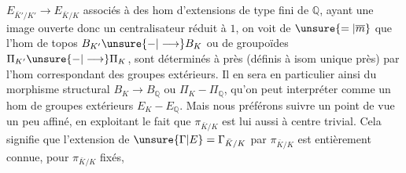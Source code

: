 $E_{\bar K'/K'}\longrightarrow E_{\bar K/K}$ associés à des hom  d'extensions de type fini de $\mathbb Q$, ayant une image ouverte donc un centralisateur réduit à $1$, on voit de $\unsure{=|\overline m}$ que l'hom de topos $B_{K'}\unsure{-|\longrightarrow}B_K$ ou de groupoïdes $\Pi_{K'}\unsure{-|\longrightarrow}\Pi_K$, sont déterminés à  près (définis à isom unique près) par l'hom correspondant des groupes extérieurs. Il en sera en particulier ainsi du morphisme structural $B_K\longrightarrow B_{\mathbb Q}$ ou $\Pi_K-\Pi_{\mathbb Q}$, qu'on peut interpréter  comme un hom de groupes  extérieurs $E_K-E_{\mathbb Q}$. Mais nous préférons suivre un point de vue un peu affiné, en exploitant le fait que $\pi_{\bar K/K}$ est lui aussi à centre trivial. Cela signifie que l'extension de $\unsure{\Gamma|E}=\Gamma_{\bar K/K}$ par $\pi_{\bar K/K}$ est entièrement connue,  pour $\pi_{\bar K/K}$  fixés,
